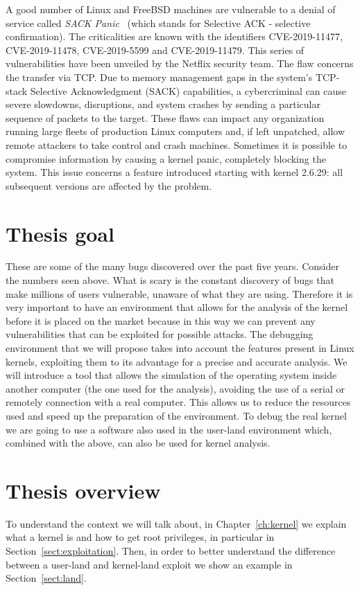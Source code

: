 \documentclass{masterthesis}
\newcommand{\vtnote}[1]{\todo[color=green!20]{#1}}
\newcommand{\refToChapter}[1]{Chapter~\ref{ch:#1}\xspace}
\newcommand{\refToSection}[1]{Section~\ref{sect:#1}\xspace}
\begin{document}
A good number of Linux and FreeBSD machines are vulnerable to a denial of service called \emph{SACK Panic} ~\cite{shitwo}(which stands for Selective ACK - selective confirmation). The criticalities are known with the identifiers CVE-2019-11477, CVE-2019-11478, CVE-2019-5599 and CVE-2019-11479.
This series of vulnerabilities have been unveiled by the Netflix security team.
The flaw concerns the transfer via TCP. Due to memory management gaps in the system's TCP-stack Selective Acknowledgment (SACK) capabilities, a cybercriminal can cause severe slowdowns, disruptions, and system crashes by sending a particular sequence of packets to the target.
These flaws can impact any organization running large fleets of production Linux computers and, if left unpatched, allow remote attackers to take control and crash machines.
Sometimes it is possible to compromise information by causing a kernel panic, completely blocking the system. This issue concerns a feature introduced starting with kernel 2.6.29: all subsequent versions are affected by the problem.

\section{Thesis goal}\vtnote{aggiunto}
These are some of the many bugs discovered over the past five years. Consider the numbers seen above. What is scary is the constant discovery of bugs that make millions of users vulnerable, unaware of what they are using.
Therefore it is very important to have an environment that allows for the analysis of the kernel before it is placed on the market because in this way we can prevent any vulnerabilities that can be exploited for possible attacks.
The debugging environment that we will propose takes into account the features present in Linux kernels, exploiting them to its advantage for a precise and accurate analysis. 
We will introduce a tool that allows the simulation of the operating system inside another computer (the one used for the analysis), avoiding the use of a serial or remotely connection with a real computer. This allows us to reduce the resources used and speed up the preparation of the environment.
To debug the real kernel we are going to use a software also used in the user-land environment which, combined with the above, can also be used for kernel analysis.

\section{Thesis overview}
To understand the context we will talk about, in \refToChapter{kernel} we explain what a kernel is and how to get root privileges, in particular in \refToSection{exploitation}. Then, in order to better understand the difference between a user-land and kernel-land exploit we show an example in \refToSection{land}.
\end{document}
